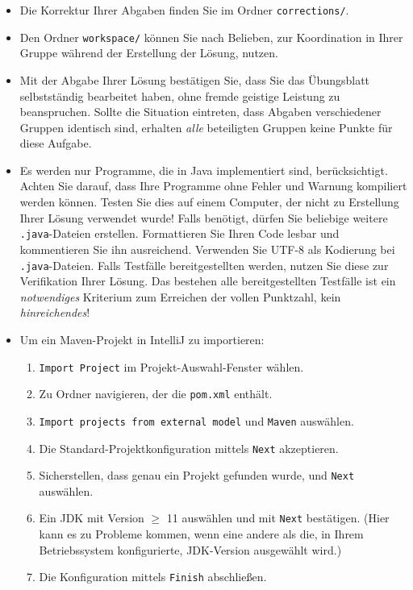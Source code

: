 \documentclass[german]{acAssignment}
\begin{document}
\begin{itemize}
    \item Die Korrektur Ihrer Abgaben finden Sie im Ordner \texttt{corrections/}.
    
    \item Den Ordner \texttt{workspace/} können Sie nach Belieben, zur Koordination in Ihrer Gruppe während der Erstellung der Lösung, nutzen.
    
    \item Mit der Abgabe Ihrer Lösung bestätigen Sie, dass Sie das Übungsblatt selbstständig bearbeitet haben, ohne fremde geistige Leistung zu beanspruchen.
        Sollte die Situation eintreten, dass Abgaben verschiedener Gruppen identisch sind, erhalten \emph{alle} beteiligten Gruppen keine Punkte für diese Aufgabe.
    
    \item Es werden nur Programme, die in Java implementiert sind, berücksichtigt.
        Achten Sie darauf, dass Ihre Programme ohne Fehler und Warnung kompiliert werden können.
        Testen Sie dies auf einem Computer, der nicht zu Erstellung Ihrer Lösung verwendet wurde!
        Falls benötigt, dürfen Sie beliebige weitere \texttt{.java}-Dateien erstellen.
        Formattieren Sie Ihren Code lesbar und kommentieren Sie ihn ausreichend.
        Verwenden Sie UTF-8 als Kodierung bei \texttt{.java}-Dateien.
        Falls Testfälle bereitgestellten werden, nutzen Sie diese zur Verifikation Ihrer Lösung.
        Das bestehen alle bereitgestellten Testfälle ist ein \emph{notwendiges} Kriterium zum Erreichen der vollen Punktzahl, kein \emph{hinreichendes}!
    
    \clearpage
    \item Um ein Maven-Projekt in IntelliJ zu importieren:
        
        \begin{enumerate}
            \item \texttt{Import Project} im Projekt-Auswahl-Fenster wählen.
            \item Zu Ordner navigieren, der die \texttt{pom.xml} enthält.
            \item \texttt{Import projects from external model} und \texttt{Maven} auswählen.
            \item Die Standard-Projektkonfiguration mittels \texttt{Next} akzeptieren.
            \item Sicherstellen, dass genau ein Projekt gefunden wurde, und \texttt{Next} auswählen.
            \item Ein JDK mit Version $\geq$ 11 auswählen und mit \texttt{Next} bestätigen.
                (Hier kann es zu Probleme kommen, wenn eine andere als die, in Ihrem Betriebssystem konfigurierte, JDK-Version ausgewählt wird.)
            \item Die Konfiguration mittels \texttt{Finish} abschließen.
        \end{enumerate}
    

\end{itemize}
\end{document}
